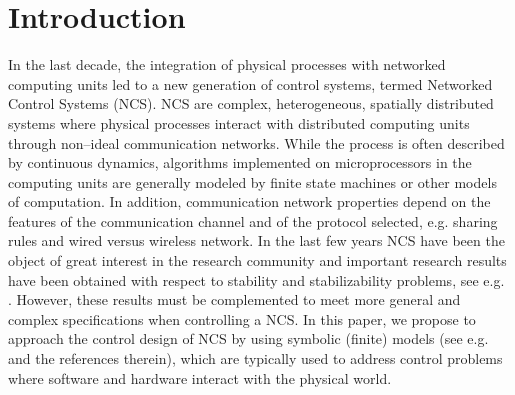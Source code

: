 \documentclass{amsart}
\begin{document}
\section{Introduction}
In the last decade, the integration of physical processes with networked computing units led to a new generation of control systems, termed Networked Control Systems (NCS). NCS are complex, heterogeneous, spatially distributed systems where physical processes interact with distributed computing units through non--ideal communication networks. While the process is often described by continuous dynamics, algorithms implemented on microprocessors in the computing units are generally modeled by finite state machines or other models of computation. In addition, communication network properties depend on the features of the communication channel and of the protocol selected, e.g. sharing rules and wired versus wireless network. In the last few years NCS have been the object of great interest in the research community and important research results have been obtained with respect to stability and stabilizability problems, see e.g. \cite{NCSHesphana,HeemelsSurvey,NCS-HSCC2010}. However, these results must be complemented to meet more general and complex specifications when controlling a NCS. In this paper, we propose to approach the control design of NCS by using symbolic (finite) models (see e.g. \cite{DiscAbs,paulo} and the references therein), which are typically used to address control problems where software and hardware interact with the physical world. 
\end{document}
